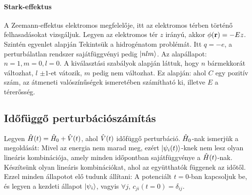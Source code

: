    \paragraph{Stark-effektus}
    
    A Zeemann-effektus elektromos megfelelője, itt az elektromos térben történő felhasadásokat vizsgáljuk. Legyen az elektromos tér $z$ irányú, akkor $\phi(\mathbf{r})=-Ez$. Szintén  egyenlet alapján
    Tekintsük a hidrogénatom problémát. Itt $q=-e$, a perturbálatlan rendszer sajátfüggvényi pedig $\lvert nlm\rangle$. Az alapállapot: $n=1, m=0, l=0$. A kiválasztási szabályok alapján láttuk, hogy $n$ bármekkorát változhat, $l$ $\pm 1$-et vátozik, $m$ pedig nem változhat. Ez alapján:
    ahol $C$ egy pozitív szám, az átmeneti valószínűségek ismeretében számítható ki, illetve $E$ a térerősség. 
   
  \subsection{Időfüggő perturbációszámítás}
   
   Legyen $\hat{H}(t)=\hat{H}_0+\hat{V}(t)$, ahol $\hat{V}(t)$ időfüggő perturbáció. $\hat{H}_0$-nak ismerjük a megoldását:
   Mivel az energia nem marad meg, ezért $\lvert\psi_i(t)\rangle$-knek nem lesz olyan lineáris kombinációja, amely minden időpontban sajátfüggvénye a $\hat{H}(t)$-nak. Készítsünk olyan lineáris kombinációkat, ahol az együtthatók függenek az időtől. Ezzel minden állapotot elő tudunk állítani:
   A potenciált $t=0$-ban kapcsoljuk be, és legyen a kezdeti állapot $\lvert\psi_i\rangle$, vagyis $\forall j$, $c_{ji}(t=0)=\delta_{ij}$.
   
